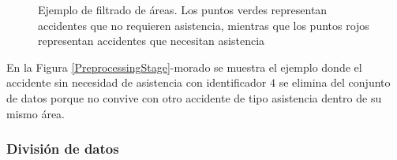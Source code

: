 \begin{figure}[H]
	\centering    
	\caption[Ejemplo de filtrado de áreas]{Ejemplo de filtrado de áreas. Los puntos verdes representan accidentes que no requieren asistencia, mientras que los puntos rojos representan accidentes que necesitan asistencia}
	\label{Areas}
\end{figure}

En la Figura \ref{PreprocessingStage}-morado se muestra el ejemplo donde el accidente sin necesidad de asistencia con identificador $4$ se elimina del conjunto de datos porque no convive con otro accidente de tipo asistencia dentro de su mismo área.

\subsubsection{División de datos}


